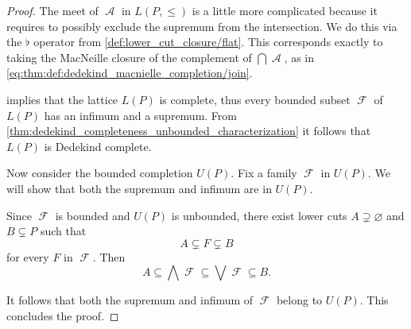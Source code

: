 \begin{proof}
  The meet of \( \mscrA \) in \( L(P, \leq) \) is a little more complicated because it requires to possibly exclude the supremum from the intersection. We do this via the \( \flat \) operator from \cref{def:lower_cut_closure/flat}.  This corresponds exactly to taking the MacNeille closure of the complement of \( \bigcap \mscrA \), as in \eqref{eq:thm:def:dedekind_macnielle_completion/join}.

    implies that the lattice \( L(P) \) is complete, thus every bounded subset \( \mscrF \) of \( L(P) \) has an infimum and a supremum. From \cref{thm:dedekind_completeness_unbounded_characterization} it follows that \( L(P) \) is Dedekind complete.

  Now consider the bounded completion \( U(P) \). Fix a family \( \mscrF \) in \( U(P) \). We will show that both the supremum and infimum are in \( U(P) \).

  Since \( \mscrF \) is bounded and \( U(P) \) is unbounded, there exist lower cuts \( A \supsetneq \varnothing \) and \( B \subsetneq P \) such that
  \begin{equation*}
    A \subsetneq F \subsetneq B
  \end{equation*}
  for every \( F \) in \( \mscrF \). Then
  \begin{equation*}
    A \subseteq \bigwedge \mscrF \subseteq \bigvee \mscrF \subseteq B.
  \end{equation*}

  It follows that both the supremum and infimum of \( \mscrF \) belong to \( U(P) \). This concludes the proof.
\end{proof}
